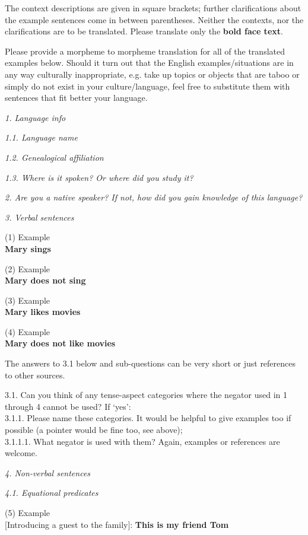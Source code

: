 \documentclass[output=paper]{langsci/langscibook}
\begin{document}
\begin{unindented}
The context descriptions are given in square brackets; further clarifications about the example sentences come in between parentheses. Neither the contexts, nor the clarifications are to be translated. Please translate only the \textbf{bold face text}. 

Please provide a morpheme to morpheme translation for all of the translated examples below. Should it turn out that the English examples/situations are in any way culturally inappropriate, e.g. take up topics or objects that are taboo or simply do not exist in your culture/language, feel free to substitute them with sentences that fit better your language. 

\textit{1. Language info}

\textit{1.1. Language name}

\textit{1.2. Genealogical affiliation}

\textit{1.3. Where is it spoken? Or where did you study it?}

\textit{2. Are you a native speaker? If not, how did you gain knowledge of
this language?}

\textit{3. Verbal sentences} 

(1) Example \\
\textbf{Mary sings} 

(2) Example \\
\textbf{Mary does not sing} 

(3) Example \\
\textbf{Mary likes movies} 

(4) Example \\
\textbf{Mary does not like movies} 

The answers to 3.1 below and sub-questions can be very short or just
references to other sources. 

3.1. Can you think of any tense-aspect categories where the negator used
in 1 through 4 cannot be used? If `yes':\\
3.1.1. Please name these categories. It would be helpful to give examples
too if possible (a pointer would be fine too, see above); \\
3.1.1.1. What negator is used with them? Again, examples or references are
welcome. 

\textit{4. Non-verbal sentences} 

\textit{4.1. Equational predicates}

(5) Example\\
{}[Introducing a guest to the family]: \textbf{This is my friend Tom}


\end{unindented}
\end{document}
